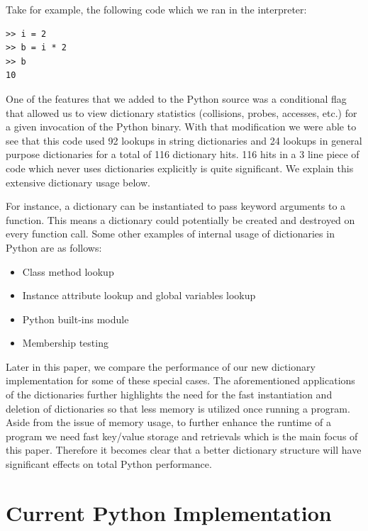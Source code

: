 \documentclass[11pt]{article}
\begin{document}
Take for example, the following code which we ran in the interpreter:

\begin{verbatim}
>> i = 2 
>> b = i * 2
>> b
10
\end{verbatim}

One of the features that we added to the Python source was a conditional flag
that allowed us to view dictionary statistics (collisions, probes, accesses,
etc.) for a given invocation of the Python binary.  With that modification we
were able to see that this code used 92 lookups in string dictionaries and 24
lookups in general purpose dictionaries for a total of 116 dictionary hits. 116
hits in a 3 line piece of code which never uses dictionaries explicitly is quite
significant.  We explain this extensive dictionary usage below.

For instance, a dictionary can be instantiated to pass keyword arguments to a
function. This means a dictionary could potentially be created and destroyed on
every function call.  Some other examples of internal usage of dictionaries in
Python are as follows:

\begin{itemize}
\item Class method lookup
\item Instance attribute lookup and global variables lookup
\item Python built-ins module
\item Membership testing
\end{itemize}

Later in this paper, we compare the performance of our new dictionary
implementation for some of these special cases. The aforementioned applications
of the dictionaries further highlights the need for the fast instantiation and
deletion of dictionaries so that less memory is utilized once running a program.
Aside from the issue of memory usage, to further enhance the runtime of a
program we need fast key/value storage and retrievals which is the main focus of
this paper. Therefore it becomes clear that a better dictionary structure will
have significant effects on total Python performance.

\section{Current Python Implementation}
\end{document}
